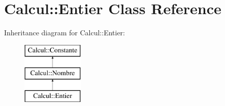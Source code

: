 \hypertarget{class_calcul_1_1_entier}{\section{Calcul\-:\-:Entier Class Reference}
\label{class_calcul_1_1_entier}
}
Inheritance diagram for Calcul\-:\-:Entier\-:\begin{figure}[H]
\begin{center}
\leavevmode
\includegraphics[height=3.000000cm]{class_calcul_1_1_entier}
\end{center}
\end{figure}
